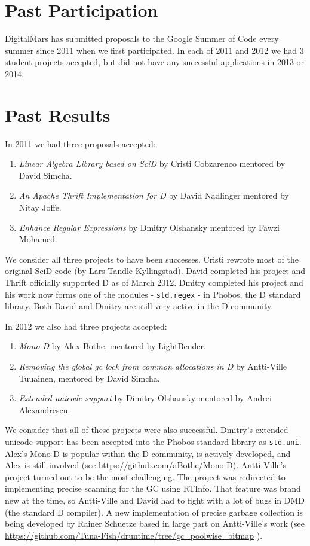 \documentclass[	DIV=calc,%
							paper=a4,%
							fontsize=11pt,%
							twocolumn]{scrartcl}	 					%
\begin{document}
\section{Past Participation}

DigitalMars has submitted proposals to the Google Summer of Code every
summer since 2011 when we first participated. In each of 2011 and 2012
we had 3 student projects accepted, but did not have any successful 
applications in 2013 or 2014.

\section{Past Results}

In 2011 we had three proposals accepted:

\begin{enumerate}
\item \emph{Linear Algebra Library based on SciD} by Cristi Cobzarenco 
 mentored by David Simcha.
\item \emph{An Apache Thrift Implementation for D} by David Nadlinger mentored 
by Nitay Joffe.
\item \emph{Enhance Regular Expressions} by Dmitry Olshansky mentored by
Fawzi Mohamed.
\end{enumerate}

We consider all three projects to have been successes. Cristi rewrote most of the 
original SciD code (by Lars Tandle Kyllingstad).  David completed his project 
and Thrift officially supported D as of March 2012.  Dmitry completed his project 
and his work  now forms one of the modules - \texttt{std.regex} - in Phobos, the D
standard library. Both David and Dmitry are still very active in the D community.

In 2012 we also had three projects accepted:

\begin{enumerate}
  \item \emph{Mono-D} by Alex Bothe, mentored by LightBender.
  \item \emph{Removing the global gc lock from common allocations in D} by 
  Antti-Ville Tuuainen, mentored by David Simcha.
  \item \emph{Extended unicode support} by Dimitry Olshansky mentored by
  Andrei Alexandrescu.
\end{enumerate}

We consider that all of these projects were also successful.  Dmitry's extended
unicode support has been accepted into the Phobos standard library as \texttt{std.uni}.
Alex's Mono-D is popular within the D community, is actively developed, and
Alex is still involved (see \url{https://github.com/aBothe/Mono-D}). Antti-Ville's project
turned out to be the most challenging.  The project was redirected to implementing
precise scanning for the GC using RTInfo.  That feature was brand new at the time, so
Antti-Ville and David had to fight with a lot of bugs in DMD (the standard D compiler).
A new implementation of precise garbage collection is being developed by Rainer Schuetze
based in large part on Antti-Ville's work (see 
\url{https://github.com/Tuna-Fish/druntime/tree/gc_poolwise_bitmap} ).
\end{document}
